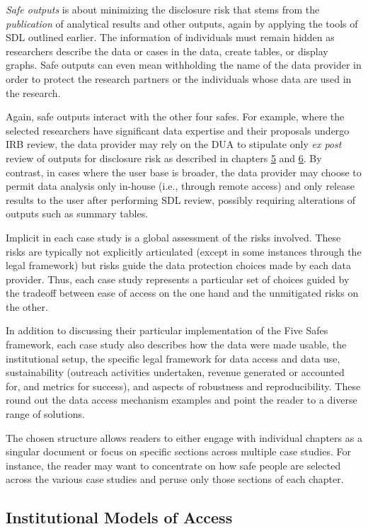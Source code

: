 \documentclass[
]{book}
\begin{document}
\emph{Safe outputs} is about minimizing the disclosure risk that stems from the \emph{publication} of analytical results and other outputs, again by applying the tools of SDL outlined earlier. The information of individuals must remain hidden as researchers describe the data or cases in the data, create tables, or display graphs. Safe outputs can even mean withholding the name of the data provider in order to protect the research partners or the individuals whose data are used in the research.

Again, safe outputs interact with the other four safes. For example, where the selected researchers have significant data expertise and their proposals undergo IRB review, the data provider may rely on the DUA to stipulate only \emph{ex post} review of outputs for disclosure risk as described in chapters \protect\hyperlink{discavoid}{5} and \protect\hyperlink{diffpriv}{6}. By contrast, in cases where the user base is broader, the data provider may choose to permit data analysis only in-house (i.e., through remote access) and only release results to the user after performing SDL review, possibly requiring alterations of outputs such as summary tables.

Implicit in each case study is a global assessment of the risks involved. These risks are typically not explicitly articulated (except in some instances through the legal framework) but risks guide the data protection choices made by each data provider. Thus, each case study represents a particular set of choices guided by the tradeoff between ease of access on the one hand and the unmitigated risks on the other.

In addition to discussing their particular implementation of the Five Safes framework, each case study also describes how the data were made usable, the institutional setup, the specific legal framework for data access and data use, sustainability (outreach activities undertaken, revenue generated or accounted for, and metrics for success), and aspects of robustness and reproducibility. These round out the data access mechanism examples and point the reader to a diverse range of solutions.

The chosen structure allows readers to either engage with individual chapters as a singular document or focus on specific sections across multiple case studies. For instance, the reader may want to concentrate on how safe people are selected across the various case studies and peruse only those sections of each chapter.

\hypertarget{institutional-models-of-access}{%
\subsection{Institutional Models of Access}\label{institutional-models-of-access}}
\end{document}

